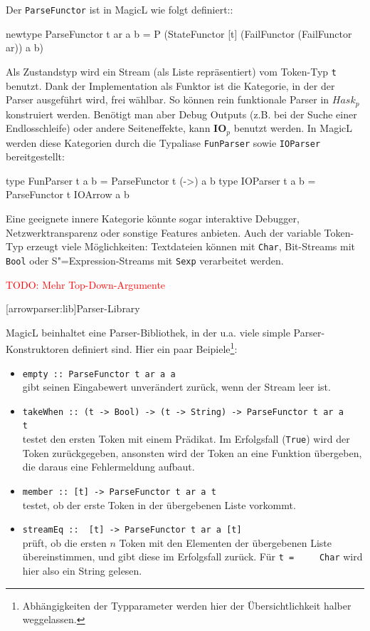 \documentclass[11pt, a4paper, bibgerm]{scrbook}
\newenvironment{DIFnomarkup}{}{}
\newcommand\icode[1]{\lstinline?#1?}
\newcommand{\todo}[1]{
  \textcolor{red}{TODO: #1}
}
\newcommand\lsection{}
\newcommand{\sexp}{S"=Expression}
\begin{document}
Der \icode{ParseFunctor} ist in MagicL wie folgt definiert::
\begin{DIFnomarkup}\begin{code}
newtype ParseFunctor t ar a b =
  P (StateFunctor
     [t]
     (FailFunctor (FailFunctor ar))
     a
     b)
\end{code}\end{DIFnomarkup}
Als Zustandstyp wird ein Stream (als Liste repräsentiert) vom Token-Typ
\icode{t} benutzt.  Dank der Implementation als Funktor ist die
Kategorie, in der der Parser ausgeführt wird, frei wählbar. So können
rein funktionale Parser in $Hask_p$ konstruiert werden. Benötigt man
aber Debug Outputs (z.B. bei der Suche einer Endlosschleife) oder andere
Seiteneffekte, kann $\mathbf{IO}_p$ benutzt werden. In MagicL werden
diese Kategorien durch die Typaliase \icode{FunParser} sowie
\icode{IOParser} bereitgestellt:
\begin{DIFnomarkup}\begin{code}
type FunParser t a b = ParseFunctor t (->) a b
type IOParser  t a b = ParseFunctor t IOArrow a b
\end{code}\end{DIFnomarkup}
Eine geeignete innere Kategorie könnte
sogar interaktive Debugger, Netzwerktransparenz oder sonstige Features
anbieten. Auch der variable Token-Typ erzeugt viele Möglichkeiten:
Textdateien können mit \icode{Char}, Bit-Streams mit \icode{Bool} oder
\sexp{}-Streams mit \icode{Sexp} verarbeitet werden.

\todo{Mehr Top-Down-Argumente}

\lsection[arrowparser:lib]{Parser-Library}

MagicL beinhaltet eine Parser-Bibliothek, in der u.a. viele simple
Parser-Konstruktoren definiert sind. Hier ein paar
Beipiele\footnote{Abhängigkeiten der Typparameter werden hier der
  Übersichtlichkeit halber weggelassen.}:
\begin{itemize}
\item \icode{empty :: ParseFunctor t ar a a}\\
  gibt seinen Eingabewert unverändert zurück, wenn der Stream leer ist.
\item \icode{takeWhen :: (t -> Bool) -> (t -> String) -> ParseFunctor t ar a
    t}\\
  testet den ersten Token mit einem Prädikat. Im Erfolgsfall (\icode{True}) wird der
  Token zurückgegeben, ansonsten wird der Token an eine Funktion
  übergeben, die daraus eine Fehlermeldung aufbaut.
\item \icode{member :: [t] -> ParseFunctor t ar a t}\\
  testet, ob der erste Token in der übergebenen Liste vorkommt.
\item \icode{streamEq ::  [t] -> ParseFunctor t ar a [t]}\\
  prüft, ob die ersten $n$ Token mit den Elementen der übergebenen Liste
  übereinstimmen, und gibt diese im Erfolgsfall zurück. Für \icode{t =
    Char} wird hier also ein String gelesen.
\end{itemize}
\end{document}
